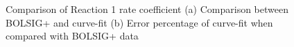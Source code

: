 \documentclass{warpdoc}
\begin{document}
\begin{figure}[H]
\centering     %
{}
\caption{Comparison of Reaction 1 rate coefficient (a) Comparison between BOLSIG+ and curve-fit (b) Error percentage of curve-fit when compared with BOLSIG+ data}
\label{fig:Reaction_1_comparison}
\end{figure}
%
%
\end{document}
